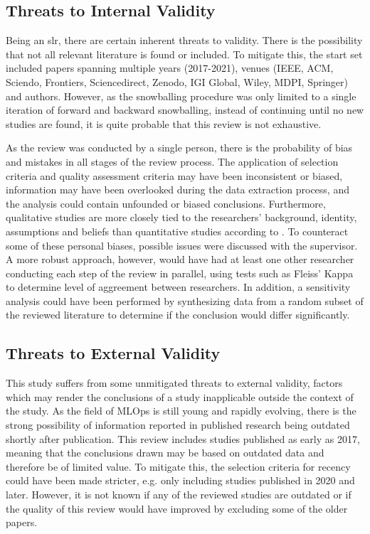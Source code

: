 \subsection{Threats to Internal Validity}
Being an \acrshort{slr}, there are certain inherent threats to validity.
There is the possibility that not all relevant literature is found or included.
To mitigate this, the start set included papers spanning multiple years (2017-2021), venues (IEEE, ACM, Sciendo, Frontiers, Sciencedirect, Zenodo, IGI Global, Wiley, MDPI, Springer) and authors.
However, as the snowballing procedure was only limited to a single iteration of forward and backward snowballing, instead of continuing until no new studies are found, it is quite probable that this review is not exhaustive.

As the review was conducted by a single person, there is the probability of bias and mistakes in all stages of the review process.
The application of selection criteria and quality assessment criteria may have been inconsistent or biased, information may have been overlooked during the data extraction process, and the analysis could contain unfounded or biased conclusions.
Furthermore, qualitative studies are more closely tied to the researchers' background, identity, assumptions and beliefs than quantitative studies according to \textcite{Oates2005}.
To counteract some of these personal biases, possible issues were discussed with the supervisor.
A more robust approach, however, would have had at least one other researcher conducting each step of the review in parallel, using tests such as Fleiss' Kappa to determine level of aggreement between researchers.
In addition, a sensitivity analysis could have been performed by synthesizing data from a random subset of the reviewed literature to determine if the conclusion would differ significantly.

\subsection{Threats to External Validity}
This study suffers from some unmitigated threats to external validity, factors which may render the conclusions of a study inapplicable outside the context of the study.
As the field of MLOps is still young and rapidly evolving, there is the strong possibility of information reported in published research being outdated shortly after publication.
This review includes studies published as early as 2017, meaning that the conclusions drawn may be based on outdated data and therefore be of limited value.
To mitigate this, the selection criteria for recency could have been made stricter, e.g. only including studies published in 2020 and later.
However, it is not known if any of the reviewed studies are outdated or if the quality of this review would have improved by excluding some of the older papers.

